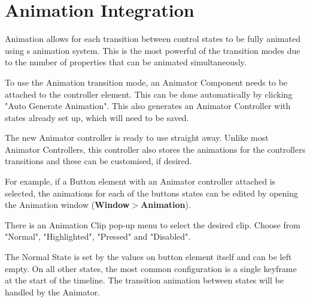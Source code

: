 \chapter{Animation Integration}
\hypertarget{md__hey_tea_9_2_library_2_package_cache_2com_8unity_8ugui_0d1_80_80_2_documentation_0i_2_u_i_animation_integration}{}\label{md__hey_tea_9_2_library_2_package_cache_2com_8unity_8ugui_0d1_80_80_2_documentation_0i_2_u_i_animation_integration}
\label{md__hey_tea_9_2_library_2_package_cache_2com_8unity_8ugui_0d1_80_80_2_documentation_0i_2_u_i_animation_integration_autotoc_md4964}%
%
 Animation allows for each transition between control states to be fully animated using \textquotesingle{}s animation system. This is the most powerful of the transition modes due to the number of properties that can be animated simultaneously.



To use the Animation transition mode, an Animator Component needs to be attached to the controller element. This can be done automatically by clicking "{}\+Auto Generate Animation"{}. This also generates an Animator Controller with states already set up, which will need to be saved.

The new Animator controller is ready to use straight away. Unlike most Animator Controllers, this controller also stores the animations for the controller\textquotesingle{}s transitions and these can be customised, if desired.



For example, if a Button element with an Animator controller attached is selected, the animations for each of the button\textquotesingle{}s states can be edited by opening the Animation window ({\bfseries{Window\texorpdfstring{$>$}{>}Animation}}).

There is an Animation Clip pop-\/up menu to select the desired clip. Choose from "{}\+Normal"{}, "{}\+Highlighted"{}, "{}\+Pressed"{} and "{}\+Disabled"{}.



The Normal State is set by the values on button element itself and can be left empty. On all other states, the most common configuration is a single keyframe at the start of the timeline. The transition animation between states will be handled by the Animator.

